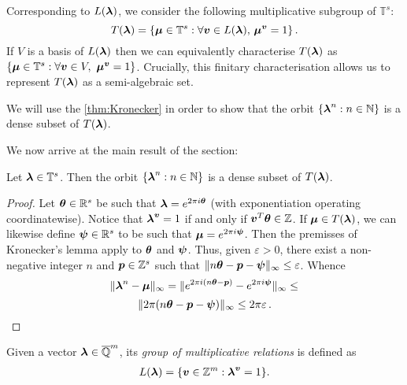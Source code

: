 Corresponding to $L(\boldsymbol{\lambda})$, we consider the following
multiplicative subgroup of $\mathbb{T}^s$:
\begin{equation*}
T(\boldsymbol{\lambda})=\lbrace \boldsymbol \mu\in\mathbb{T}^s : \forall \boldsymbol v\in L(\boldsymbol\lambda),\,\boldsymbol\mu^{\boldsymbol v}=1\rbrace \, .
\end{equation*}
If $V$ is a basis of $L(\boldsymbol{\lambda})$ then we can
equivalently characterise $T(\boldsymbol{\lambda})$ as $\{
\boldsymbol{\mu} \in \mathbb{T}^s: \forall \boldsymbol{v}\in
V,\,\,\boldsymbol\mu^{\boldsymbol v}=1\}$.  Crucially, this finitary
characterisation allows us to represent $T(\boldsymbol\lambda)$ as a
semi-algebraic set.

We will use the \cref{thm:Kronecker} in order to show that the orbit $\lbrace
\boldsymbol\lambda^n : n\in\mathbb{N} \rbrace$ is a dense subset of
$T(\boldsymbol{\lambda})$.

We now arrive at the main result of the section:

\begin{theorem}
\label{dense}
Let $\boldsymbol{\lambda}\in\mathbb{T}^s$. Then the orbit $\lbrace \boldsymbol\lambda^n : n\in\mathbb{N} \rbrace$ is a dense subset of $T(\boldsymbol{\lambda})$.
\end{theorem}

\begin{proof}
  Let $\boldsymbol \theta\in\mathbb{R}^s$ be such that
  $\boldsymbol\lambda=e^{2\pi i\boldsymbol\theta}$ (with
  exponentiation operating coordinatewise). Notice that
  $\boldsymbol\lambda^{\boldsymbol v}=1$ if and only if $\boldsymbol v^T
  \boldsymbol\theta\in\mathbb{Z}$. If $\boldsymbol\mu\in
  T(\boldsymbol{\lambda})$, we can likewise define
  $\boldsymbol\psi\in\mathbb{R}^s$ to be such that
  $\boldsymbol\mu=e^{2\pi i \boldsymbol\psi}$. Then the premisses of
  Kronecker's lemma apply to $\boldsymbol \theta$ and $\boldsymbol
  \psi$. Thus, given $\varepsilon>0$, there exist a non-negative
  integer $n$ and $\boldsymbol p\in\mathbb{Z}^s$ such that $\|
  n\boldsymbol \theta -\boldsymbol p-\boldsymbol \psi \|_\infty
  \leq\varepsilon$. Whence
\[ \| \boldsymbol\lambda^n-\boldsymbol\mu \|_\infty = \| e^{2\pi i(n\boldsymbol\theta-\boldsymbol p)}-e^{2\pi i \boldsymbol\psi} \|_\infty \leq \]
\[ \| 2\pi (n\boldsymbol \theta -\boldsymbol p - \boldsymbol \psi) \|_\infty \leq 2\pi\varepsilon \, .\]
\end{proof}

Given a vector $\boldsymbol{\lambda} \in \overline{\mathbb{Q}}^{m}$, its \emph{group of multiplicative relations} is defined as
\begin{align*}
L(\boldsymbol{\lambda}) = \lbrace \boldsymbol{v} \in \mathbb{Z}^{m} : \boldsymbol{\lambda}^{\boldsymbol{v}} = 1 \rbrace .
\end{align*}

